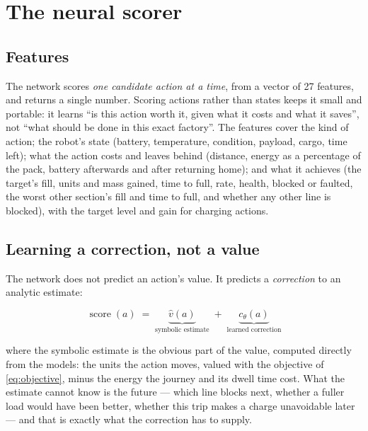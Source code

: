 \section{The neural scorer}
\label{sec:neural-ranker}

\subsection{Features}
\label{sec:features}

The network scores \emph{one candidate action at a time}, from a vector of \num{27} features, and
returns a single number. Scoring actions rather than states keeps it small and portable: it learns
``is this action worth it, given what it costs and what it saves'', not ``what should be done in
this exact factory''. The features cover the kind of action; the robot's state (battery,
temperature, condition, payload, cargo, time left); what the action costs and leaves behind
(distance, energy as a percentage of the pack, battery afterwards and after returning home); and
what it achieves (the target's fill, units and mass gained, time to full, rate, health, blocked or
faulted, the worst other section's fill and time to full, and whether any other line is blocked),
with the target level and gain for charging actions.

\subsection{Learning a correction, not a value}
\label{sec:residual}

The network does not predict an action's value. It predicts a \emph{correction} to an analytic
estimate:

\begin{equation}
    \label{eq:score}
    \operatorname{score}(a) \;=\; \underbrace{\hat{v}(a)}_{\text{symbolic estimate}}
        \;+\; \underbrace{c_\theta(a)}_{\text{learned correction}}
\end{equation}

where the symbolic estimate is the obvious part of the value, computed directly from the models:
the units the action moves, valued with the objective of \cref{eq:objective}, minus the energy the
journey and its dwell time cost. What the estimate cannot know is the future --- which line blocks
next, whether a fuller load would have been better, whether this trip makes a charge unavoidable
later --- and that is exactly what the correction has to supply.

